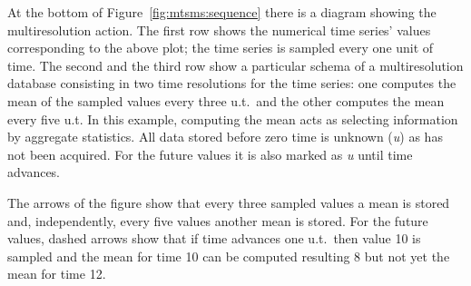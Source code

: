At the bottom of Figure~\ref{fig:mtsms:sequence} there is a diagram
showing the multiresolution action. The first row shows the numerical
time series' values corresponding to the above plot; the time series
is sampled every one unit of time. The second and the third row show a
particular schema of a multiresolution database consisting in two time
resolutions for the time series: one computes the mean of the sampled
values every three u.t.\ and the other computes the mean every five
u.t. In this example, computing the mean acts as selecting information
by aggregate statistics. All data stored before zero time is unknown
(\emph{u}) as has not been acquired. For the future values it is also
marked as \emph{u} until time advances.

The arrows of the figure show that every three sampled values a mean
is stored and, independently, every five values another mean is
stored. For the future values, dashed arrows show that if time
advances one u.t.\ then value 10 is sampled and the mean for time 10
can be computed resulting 8 but not yet the mean for time 12.






